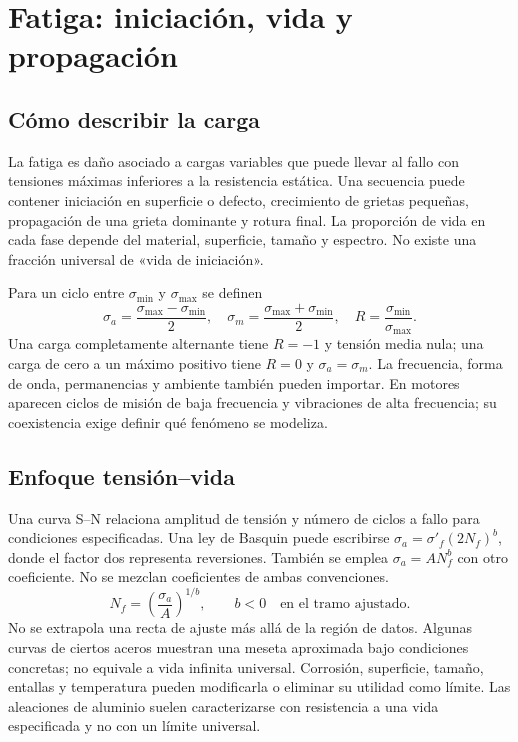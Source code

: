 \chapter{Fatiga: iniciación, vida y propagación}\label{ch:04}
\section{Cómo describir la carga}
La fatiga es daño asociado a cargas variables que puede llevar al fallo con tensiones máximas inferiores a la resistencia estática. Una secuencia puede contener iniciación en superficie o defecto, crecimiento de grietas pequeñas, propagación de una grieta dominante y rotura final. La proporción de vida en cada fase depende del material, superficie, tamaño y espectro. No existe una fracción universal de «vida de iniciación».

Para un ciclo entre $\sigma_{\min}$ y $\sigma_{\max}$ se definen
\begin{equation}\sigma_a=\frac{\sigma_{\max}-\sigma_{\min}}2,\quad\sigma_m=\frac{\sigma_{\max}+\sigma_{\min}}2,\quad R=\frac{\sigma_{\min}}{\sigma_{\max}}.\label{eq:ciclo}\end{equation}
Una carga completamente alternante tiene $R=-1$ y tensión media nula; una carga de cero a un máximo positivo tiene $R=0$ y $\sigma_a=\sigma_m$. La frecuencia, forma de onda, permanencias y ambiente también pueden importar. En motores aparecen ciclos de misión de baja frecuencia y vibraciones de alta frecuencia; su coexistencia exige definir qué fenómeno se modeliza.
\section{Enfoque tensión--vida}
Una curva S--N relaciona amplitud de tensión y número de ciclos a fallo para condiciones especificadas. Una ley de Basquin puede escribirse $\sigma_a=\sigma'_f(2N_f)^b$, donde el factor dos representa reversiones. También se emplea $\sigma_a=A N_f^b$ con otro coeficiente. No se mezclan coeficientes de ambas convenciones.
\begin{equation}N_f=\left(\frac{\sigma_a}{A}\right)^{1/b},\qquad b<0\quad\text{en el tramo ajustado}.\label{eq:basquin}\end{equation}
No se extrapola una recta de ajuste más allá de la región de datos. Algunas curvas de ciertos aceros muestran una meseta aproximada bajo condiciones concretas; no equivale a vida infinita universal. Corrosión, superficie, tamaño, entallas y temperatura pueden modificarla o eliminar su utilidad como límite. Las aleaciones de aluminio suelen caracterizarse con resistencia a una vida especificada y no con un límite universal.

